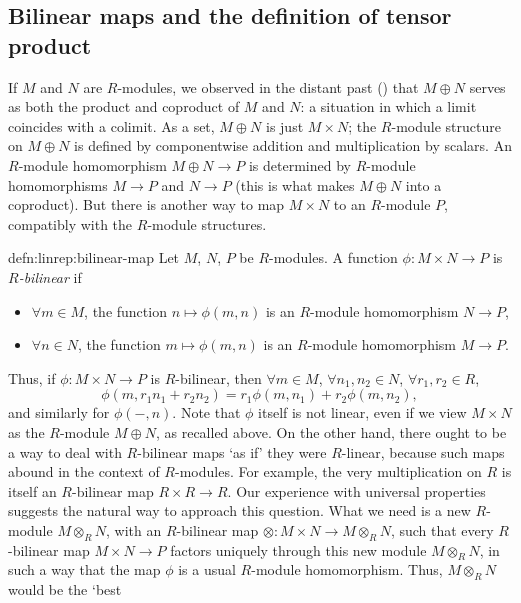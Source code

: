 \subsection{Bilinear maps and the definition of tensor product}%
\label{subsec:linrep:bilinear-maps-and-the-definition-of-tensor-product}
If $M$ and $N$ are $R$-modules, we observed in the distant past
() that $M \oplus N$
serves as both the product and coproduct of $M$ and $N$: a situation
in which a limit coincides with a colimit. As a set, $M \oplus N$ is
just $M \times N$; the $R$-module structure on $M \oplus N$ is defined
by componentwise addition and multiplication by scalars. An $R$-module
homomorphism $M \oplus N \to P$ is determined by $R$-module
homomorphisms $M \to P$ and $N \to P$ (this is what makes $M \oplus N$
into a coproduct). But there is another way to map $M \times N$ to an
$R$-module $P$, compatibly with the $R$-module structures.
\begin{defn}{}{defn:linrep:bilinear-map}
  Let $M$, $N$, $P$ be $R$-modules. A function
  $\phi : M \times N \to P$ is \emph{$R$-bilinear} if
  \begin{itemize}
  \item $\forall m \in M$, the function $n \mapsto \phi(m, n)$ is an
    $R$-module homomorphism $N \to P$,
  \item $\forall n \in N$, the function $m \mapsto \phi(m, n)$ is an
    $R$-module homomorphism $M \to P$.
  \end{itemize}
\end{defn}
Thus, if $\phi : M \times N \to P$ is $R$-bilinear, then
$\forall m \in M$, $\forall n_1, n_2 \in N$, $\forall r_1, r_2 \in R$,
\[
  \phi(m, r_1 n_1 + r_2 n_2) = r_1 \phi(m, n_1) + r_2 \phi(m, n_2),
\]
and similarly for $\phi(\mathord{-}, n)$. Note that $\phi$ itself is
not linear, even if we view $M \times N$ as the $R$-module
$M \oplus N$, as recalled above. On the other hand, there ought to be
a way to deal with $R$-bilinear maps `as if' they were $R$-linear,
because such maps abound in the context of $R$-modules. For example,
the very multiplication on $R$ is itself an $R$-bilinear map
$R \times R \to R$.  Our experience with universal properties suggests
the natural way to approach this question. What we need is a new
$R$-module $M \otimes_R N$, with an $R$-bilinear map
$\otimes : M \times N \to M \otimes_R N$, such that every $R$-bilinear
map $M \times N \to P$ factors uniquely through this new module
$M \otimes_R N$, in such a way that the map $\phi$ is a usual
$R$-module homomorphism. Thus, $M \otimes_R N$ would be the `best
